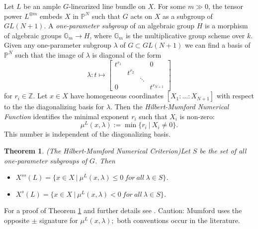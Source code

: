 \documentclass{amsart}
\newcommand{\Z}{\mathbb{Z}}
\newcommand{\G}{\mathbb{G}}
\newcommand{\Pj}{\mathbb{P}}
\numberwithin{equation}{section}
\newtheorem{thm}[prop]{Theorem}
\theoremstyle{definition}
\begin{document}
Let $L$ be an ample $G$-linearized line bundle on $X$. For some $m \gg 0$, the tensor power $L^{\otimes m}$ embeds $X$ in $\Pj^N$ such that $G$ acts on $X$ as a subgroup of $GL(N+1)$. A \textit{one-parameter subgroup} of an algebraic group $H$ is a morphism of algebraic groups $\G_m \rightarrow H$, where $\G_m$ is the multiplicative group scheme over $k$. Given any one-parameter subgroup $\lambda$ of $G \subset GL(N+1)$ we can find a basis of $\Pj^N$ such that the image of $\lambda$ is diagonal of the form
$$ \lambda: t \mapsto \begin{bmatrix}
    t^{r_1} & & & 0\\
    & t^{r_2} & & \\
    & & \ddots & \\
   0 & & & t^{r_{N+1}}
\end{bmatrix} $$
for $r_i \in \Z$. Let $x \in X$ have homogeneous coordinates $[X_1: \dots : X_{N+1}]$ with respect to the the diagonalizing basis for $\lambda$. Then the \textit{Hilbert-Mumford Numerical Function} identifies the minimal exponent $r_i$ such that $X_i$ is non-zero:
$$\mu^L (x, \lambda) := \min \{r_i \ | \ X_i \neq 0\}.$$
This number is independent of the diagonalizing basis. 


\begin{thm}{(The Hilbert-Mumford Numerical Criterion)}\label{theorem:Mumf}
    Let $S$ be the set of all one-parameter subgroups of $G$. Then
    \begin{itemize}
        \item $X^{ss}(L) = \{ x \in X \ | \ \mu^L(x, \lambda) \leq 0 \ for \ all \ \lambda \in S  \}$.
            \item $X^{s}(L) = \{ x \in X \ | \ \mu^L(x, \lambda) < 0 \ for \ all \ \lambda \in S  \}$.
    \end{itemize}
\end{thm}

For a proof of Theorem \ref{theorem:Mumf} and further details see \cite[Chapter 2.1]{Mum82}. Caution: Mumford uses the opposite $\pm$ signature for $\mu^L(x, \lambda);$ both conventions occur in the literature. 
\end{document}
